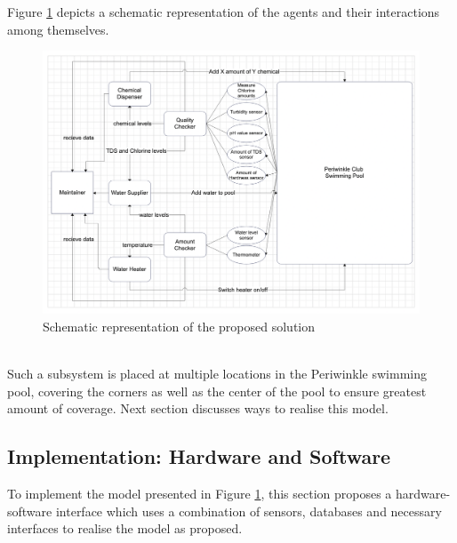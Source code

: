 \documentclass[12pt]{article}
\begin{document}
    Figure \ref{diag} depicts a schematic representation of the agents and their interactions among themselves.
    \begin{figure}
        \centering
        \includegraphics[width = \textwidth]{AgentInteraction}
        \caption{Schematic representation of the proposed solution}
        \label{diag}
    \end{figure}
    \\
    Such a subsystem is placed at multiple locations in the Periwinkle swimming pool, covering the corners as well as the center of the pool to ensure greatest amount of coverage. Next section discusses ways to realise this model.
    \subsection{Implementation: Hardware and Software}
    To implement the model presented in Figure \ref{diag}, this section proposes a hardware-software interface which uses a combination of sensors, databases and necessary interfaces to realise the model as proposed.
    
\end{document}
